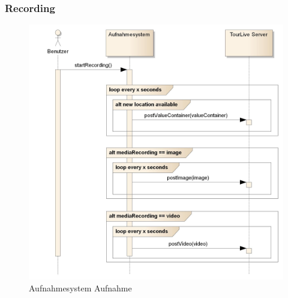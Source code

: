 \subsubsection{Recording}
\begin{figure}[H]
	\centering
	\includegraphics[width=150mm]{images/android/recording.jpg}
	\caption{Aufnahmesystem Aufnahme}
\end{figure}